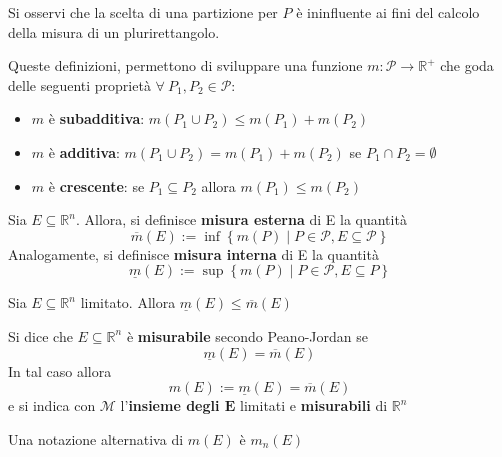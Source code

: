 \begin{oss}
    Si osservi che la scelta di una partizione per $P$ è ininfluente ai fini del calcolo della misura di un plurirettangolo.
\end{oss}
Queste definizioni, permettono di sviluppare una funzione $m: \mathcal{P} \to \mathbb{R}^+$ che goda delle seguenti proprietà $ \forall\ P_1, P_2\in \mathcal{P}$:
\begin{itemize}
    \item $m$ è \textbf{subadditiva}: $m(P_1 \cup P_2) \leq m(P_1)+m(P_2)$
    \item $m$ è \textbf{additiva}: $m(P_1 \cup P_2)=m(P_1)+m(P_2)$ se $P_1 \cap P_2 = \emptyset$
    \item $m$ è \textbf{crescente}: se $P_1 \subseteq P_2$ allora $m(P_1) \leq m(P_2)$
\end{itemize}
\begin{definition} \label{Def: Misura interna, misura esterna}
Sia $E \subseteq \mathbb{R}^n$. Allora, si definisce \textbf{misura esterna} di E la quantità 
\begin{equation*}
    \overline{m}(E) := \inf\left\{m(P) \mid P \in \mathcal{P}, E \subseteq \mathcal{P} \right\}
\end{equation*}
Analogamente, si definisce \textbf{misura interna} di E la quantità
\begin{equation*}
    \underline{m}(E) := \sup\left\{m(P) \mid P \in \mathcal{P}, E \subseteq P\right\}
\end{equation*}
\end{definition}
\begin{proposition}
    Sia $E \subseteq \mathbb{R}^n$ limitato. Allora $\underline{m}(E) \leq \overline{m}(E)$
\end{proposition}
\begin{definition} \label{Def: Insieme misurabile}
    Si dice che $E \subseteq \mathbb{R}^n$ è \textbf{misurabile} secondo Peano-Jordan se
    \begin{equation*}
        \underline{m}(E)=\overline{m}(E)
    \end{equation*}
    In tal caso allora
    \begin{equation*}
        m(E) := \underline{m}(E)=\overline{m}(E)
    \end{equation*}
    e si indica con $\mathcal{M}$ l'\textbf{insieme degli $\mathbf{E}$} limitati e \textbf{misurabili} di $\mathbb{R}^n$
\end{definition}
\begin{oss}
    Una notazione alternativa di $m(E)$ è $m_n(E)$
\end{oss}
